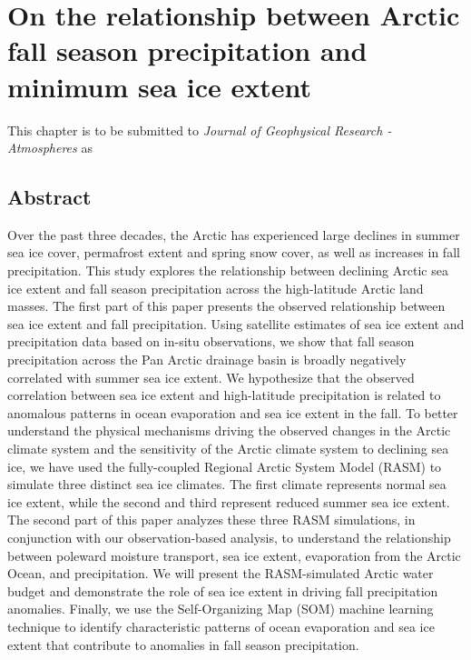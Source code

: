 
\chapter{On the relationship between Arctic fall season precipitation and minimum sea ice extent}
\label{chap:fall_prec}

This chapter is to be submitted to \textit{Journal of Geophysical Research - Atmospheres} as


\section*{Abstract}

Over the past three decades, the Arctic has experienced large declines in summer sea ice cover, permafrost extent and spring snow cover, as well as increases in fall precipitation.
This study explores the relationship between declining Arctic sea ice extent and fall season precipitation across the high-latitude Arctic land masses.
The first part of this paper presents the observed relationship between sea ice extent and fall precipitation.
Using satellite estimates of sea ice extent and precipitation data based on in-situ observations, we show that fall season precipitation across the Pan Arctic drainage basin is broadly negatively correlated with summer sea ice extent.
We hypothesize that the observed correlation between sea ice extent and high-latitude precipitation is related to anomalous patterns in ocean evaporation and sea ice extent in the fall.
To better understand the physical mechanisms driving the observed changes in the Arctic climate system and the sensitivity of the Arctic climate system to declining sea ice, we have used the fully-coupled Regional Arctic System Model (RASM) to simulate three distinct sea ice climates.
The first climate represents normal sea ice extent, while the second and third represent reduced summer sea ice extent.
The second part of this paper analyzes these three RASM simulations, in conjunction with our observation-based analysis, to understand the relationship between poleward moisture transport, sea ice extent, evaporation from the Arctic Ocean, and precipitation.
We will present the RASM-simulated Arctic water budget and demonstrate the role of sea ice extent in driving fall precipitation anomalies.
Finally, we use the Self-Organizing Map (SOM) machine learning technique to identify characteristic patterns of ocean evaporation and sea ice extent that contribute to anomalies in fall season precipitation.

